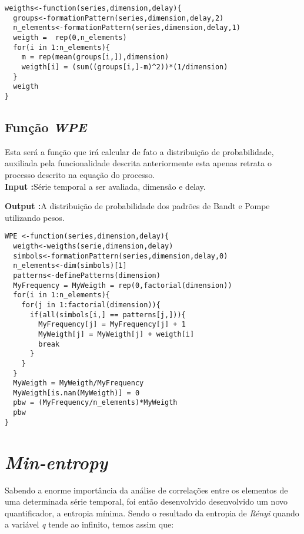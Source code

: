 \documentclass[12pt,letterpaper]{article}
\begin{document}
\begin{lstlisting}
weigths<-function(series,dimension,delay){
  groups<-formationPattern(series,dimension,delay,2)
  n_elements<-formationPattern(series,dimension,delay,1)
  weigth =  rep(0,n_elements)
  for(i in 1:n_elements){
    m = rep(mean(groups[i,]),dimension)
    weigth[i] = (sum((groups[i,]-m)^2))*(1/dimension)
  }
  weigth
}
\end{lstlisting}

\subsection{Função \textit{WPE}}

Esta será a função que irá calcular de fato a distribuição de probabilidade, auxiliada pela funcionalidade descrita anteriormente esta apenas retrata o processo descrito na equação do processo.\\

\textbf{Input :}Série temporal a ser avaliada, dimensão e delay.

\textbf{Output :}A distribuição de probabilidade dos padrões de Bandt e Pompe utilizando pesos.\\

\begin{lstlisting}
WPE <-function(series,dimension,delay){
  weigth<-weigths(serie,dimension,delay)
  simbols<-formationPattern(series,dimension,delay,0)
  n_elements<-dim(simbols)[1]
  patterns<-definePatterns(dimension)
  MyFrequency = MyWeigth = rep(0,factorial(dimension))
  for(i in 1:n_elements){
    for(j in 1:factorial(dimension)){ 
      if(all(simbols[i,] == patterns[j,])){
        MyFrequency[j] = MyFrequency[j] + 1
        MyWeigth[j] = MyWeigth[j] + weigth[i]
        break
      }
    }
  }
  MyWeigth = MyWeigth/MyFrequency
  MyWeigth[is.nan(MyWeigth)] = 0
  pbw = (MyFrequency/n_elements)*MyWeigth
  pbw
}
\end{lstlisting}

\section{\textit{Min-entropy}}

Sabendo a enorme importância da análise de correlações entre os elementos de uma determinada série temporal, foi então desenvolvido desenvolvido um novo quantificador, a entropia mínima. Sendo o resultado da entropia de \textit{Rényi} quando a variável \textit{q} tende ao infinito, temos assim que: 
\end{document}
